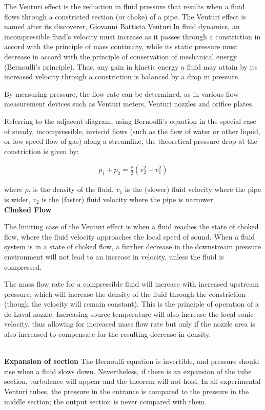 \begin{phybox}{}
    {The Venturi effect is the reduction in fluid pressure that results when a fluid flows through a constricted section (or choke) of a pipe. The Venturi effect is named after its discoverer, Giovanni Battista Venturi.In fluid dynamics, an incompressible fluid's velocity must increase as it passes through a constriction in accord with the principle of mass continuity, while its static pressure must decrease in accord with the principle of conservation of mechanical energy (Bernoulli's principle). Thus, any gain in kinetic energy a fluid may attain by its increased velocity through a constriction is balanced by a drop in pressure.

    By measuring pressure, the flow rate can be determined, as in various flow measurement devices such as Venturi meters, Venturi nozzles and orifice plates.
    
    Referring to the adjacent diagram, using Bernoulli's equation in the special case of steady, incompressible, inviscid flows (such as the flow of water or other liquid, or low speed flow of gas) along a streamline, the theoretical pressure drop at the constriction is given by:}

    \begin{align*}
        p_1+p_2=\frac{\rho}{2} (v_2^2-v_1^2)  
    \end{align*}

    {where $\rho$, is the density of the fluid, $v_1$ is the (slower) fluid velocity where the pipe is wider, $v_2$ is the (faster) fluid velocity where the pipe is narrower }
     \\
    \textbf{Choked Flow}
    {The limiting case of the Venturi effect is when a fluid reaches the state of choked flow, where the fluid velocity approaches the local speed of sound. When a fluid system is in a state of choked flow, a further decrease in the downstream pressure environment will not lead to an increase in velocity, unless the fluid is compressed.

    The mass flow rate for a compressible fluid will increase with increased upstream pressure, which will increase the density of the fluid through the constriction (though the velocity will remain constant). This is the principle of operation of a de Laval nozzle. Increasing source temperature will also increase the local sonic velocity, thus allowing for increased mass flow rate but only if the nozzle area is also increased to compensate for the resulting decrease in density.}
    \\
    \textbf{Expansion of section}
    {The Bernoulli equation is invertible, and pressure should rise when a fluid slows down. Nevertheless, if there is an expansion of the tube section, turbulence will appear and the theorem will not hold. In all experimental Venturi tubes, the pressure in the entrance is compared to the pressure in the middle section; the output section is never compared with them.}
\end{phybox}
